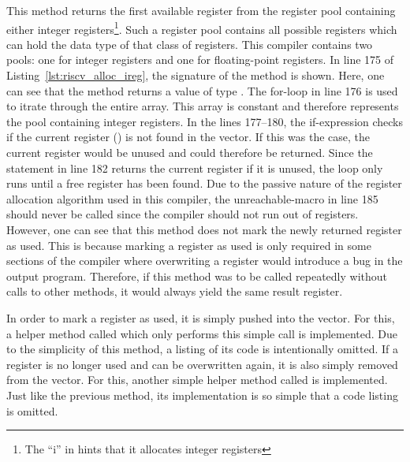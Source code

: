 This method returns the first available register from the register pool containing either integer registers\footnote{The \enquote{i} in  hints that it allocates integer registers}.
Such a register pool contains all possible registers which can hold the data type of that class of registers.
This compiler contains two pools: one for integer registers and one for floating-point registers.
In line 175 of Listing~\ref{lst:riscv_alloc_ireg}, the signature of the method is shown.
Here, one can see that the method returns a value of type .
The for-loop in line 176 is used to itrate through the entire  array.
This array is constant and therefore represents the pool containing integer registers.
In the lines 177--180, the if-expression checks if the current register () is not found in the  vector.
If this was the case, the current register would be unused and could therefore be returned.
Since the  statement in line 182 returns the current register if it is unused, the loop only runs until a free register has been found.
Due to the passive nature of the register allocation algorithm used in this compiler, the unreachable-macro in line 185 should never be called since the compiler should not run out of registers.
However, one can see that this method does not mark the newly returned register as used.
This is because marking a register as used is only required in some sections of the compiler where overwriting a register would introduce a bug in the output program.
Therefore, if this method was to be called repeatedly without calls to other methods, it would always yield the same result register.

In order to mark a register as used, it is simply pushed into the  vector.
For this, a helper method called  which only performs this simple call is implemented.
Due to the simplicity of this method, a listing of its code is intentionally omitted.
If a register is no longer used and can be overwritten again, it is also simply removed from the  vector.
For this, another simple helper method called  is implemented.
Just like the previous method, its implementation is so simple that a code listing is omitted.

